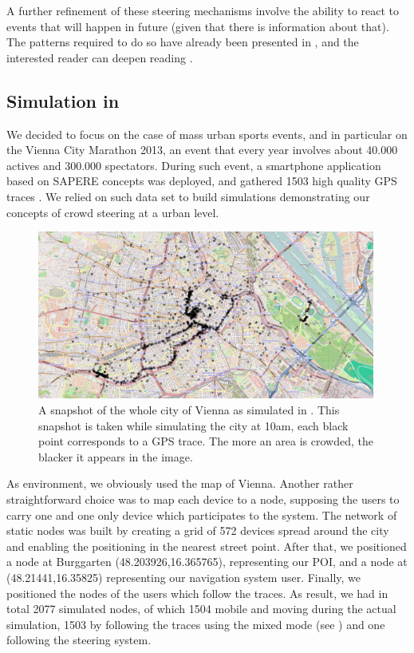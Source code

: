 \documentclass[12pt,a4paper,twoside,openright]{book}
\begin{document}
A further refinement of these steering mechanisms involve the ability to react to events that will happen in future (given that there is information about that).
%
The patterns required to do so have already been presented in , and the interested reader can deepen reading \cite{anticipativegradient-SASO12}.

\subsection{Simulation in \alchemist{}}
\label{ahpc-simulation}
We decided to focus on the case of mass urban sports events, and in particular on the Vienna City Marathon 2013, an event that every year involves about 40.000 actives and 300.000 spectators.
%
During such event, a smartphone application based on SAPERE \cite{sapere-procedia7} concepts was deployed, and gathered 1503 high quality GPS traces \cite{socinfo2013}.
%
We relied on such data set to build simulations demonstrating our concepts of crowd steering at a urban level.

\begin{figure}[h]
 \includegraphics[width=0.99\textwidth]{img/vienna}
  \caption[Vienna simulated in \alchemist{}]{A snapshot of the whole city of Vienna as simulated in \alchemist{}. This snapshot is taken while simulating the city at 10am, each black point corresponds to a GPS trace. The more an area is crowded, the blacker it appears in the image.}
  \label{img:ahpc-vienna}
\end{figure}

As \alchemist{} environment, we obviously used the map of Vienna.
%
Another rather straightforward choice was to map each device to a node, supposing the users to carry one and one only device which participates to the system.
%
The network of static nodes was built by creating a grid of 572 devices spread around the city and enabling the positioning in the nearest street point.
%
After that, we positioned a node at Burggarten (48.203926,16.365765), representing our POI, and a node at (48.21441,16.35825) representing our navigation system user.
%
Finally, we positioned the nodes of the users which follow the traces.
%
As result, we had in total 2077 simulated nodes, of which 1504 mobile and moving during the actual simulation, 1503 by following the traces using the mixed mode (see ) and one following the steering system.
\end{document}
